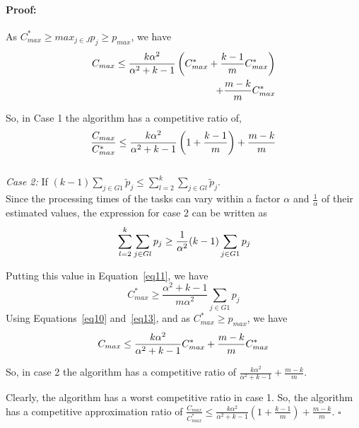 \documentclass[12pt]{article}
\theoremstyle{mystyle}
\newenvironment{myproof}{\paragraph{Proof:}}{\hfill$\square$}
\begin{document}
\begin{myproof}
      As $C_{max}^{*}\geq {{max_{j \in J}}{p_{j}}}\geq p_{max}$, we have
      \begin{align}{\nonumber}
        C_{max} \leq \frac{k\alpha^{2}}{\alpha^{2}+k-1}\left( C_{max}^{*}+ {\frac{k-1}{m}}{C_{max}^{*}}\right)\\
        + {\frac{m-k}{m}} C_{max}^{*} \nonumber
      \end{align}    
      
      So, in Case 1 the algorithm has a competitive ratio of,
      \begin{equation}{\nonumber}
        \frac{C_{max}}{C_{max}^{*}} \leq \frac{k\alpha^{2}}{\alpha^{2}+k-1}\left( 1+ {\frac{k-1}{m}} \right) + {\frac{m-k}{m}} \end{equation}\\
      
      \textit{Case 2:} If $(k-1)\sum_{j \in G1 }^{}{\tilde p_{j}} \leq \sum_{l=2}^{k}\sum_{j \in Gl }^{}{\tilde p_{j}}$. \\
      
      Since the processing times of the tasks can vary within a factor
      $\alpha$ and $\frac{1}{\alpha}$ of their estimated values, the
      expression for case 2 can be written as
      \begin{equation}{\nonumber}
        \sum_{l=2}^{k}\sum_{j \in Gl }^{}{ p_{j}} \geq \frac{1}{\alpha^2} (k-1)\sum_{j \in G1 }^{}{ p_{j}}
      \end{equation}
      
      Putting this value in Equation~\ref{eq11}, we have
      \begin{equation}\label{eq13}
        C_{max}^{*} \geq \frac{\alpha^2+k-1}{m\alpha^2}\sum_{j \in G1 }^{}{ p_{j}}
      \end{equation}
      Using Equations~\ref{eq10} and~\ref{eq13}, and as $C_{max}^{*} \geq p_{max}$, we have
      \begin{equation}{\nonumber}
        C_{max} \leq \frac{k\alpha^2}{\alpha^2+k-1}C_{max}^{*}+\frac{m-k}{m}C_{max}^{*}
      \end{equation}
      
      So, in case 2 the algorithm has a competitive ratio of
      $\frac{k\alpha^2}{\alpha^2+k-1}+\frac{m-k}{m}$.
    
      Clearly, the algorithm has a worst competitive ratio in case 1.  So,
      the algorithm has a competitive approximation ratio of
      $\frac{C_{max}}{C_{max}^{*}} \leq \frac{k\alpha^{2}}{\alpha^{2}+k-1}
      \left( 1+ {\frac{k-1}{m}} \right) + {\frac{m-k}{m}}$.
    \end{myproof}
    
\end{document}
